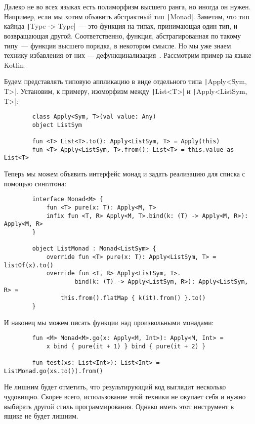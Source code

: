 \documentclass[12pt]{article}
\begin{document}

    Далеко не во всех языках есть полиморфизм высшего ранга, но иногда он нужен.
    Например, если мы хотим объявить абстрактный тип \texttt|Monad|.
    Заметим, что тип кайнда \texttt|Type -> Type|~--- это функция на типах, принимающая один тип, и возвращающая другой.
    Соответственно, функция, абстрагированная по такому типу~--- функция высшего порядка, в некотором смысле.
    Но мы уже знаем технику избавления от них --- дефункцинализация~\cite{defunctionalization-slides}.
    Рассмотрим пример на языке Kotlin.

    Будем представлять типовую аппликацию в виде отдельного типа \texttt|Apply<Sym, T>|.
    Установим, к примеру, изоморфизм между \texttt|List<T>| и \texttt|Apply<ListSym, T>|:
    \begin{verbatim}
        class Apply<Sym, T>(val value: Any)
        object ListSym

        fun <T> List<T>.to(): Apply<ListSym, T> = Apply(this)
        fun <T> Apply<ListSym, T>.from(): List<T> = this.value as List<T>
    \end{verbatim}

    Теперь мы можем объявить интерфейс монад и задать реализацию для списка с помощью синглтона:
    \begin{verbatim}
        interface Monad<M> {
            fun <T> pure(x: T): Apply<M, T>
            infix fun <T, R> Apply<M, T>.bind(k: (T) -> Apply<M, R>): Apply<M, R>
        }

        object ListMonad : Monad<ListSym> {
            override fun <T> pure(x: T): Apply<ListSym, T> = listOf(x).to()
            override fun <T, R> Apply<ListSym, T>.
                    bind(k: (T) -> Apply<ListSym, R>): Apply<ListSym, R> =
                this.from().flatMap { k(it).from() }.to()
        }
    \end{verbatim}

    И наконец мы можем писать функции над произвольными монадами:
    \begin{verbatim}
        fun <M> Monad<M>.go(x: Apply<M, Int>): Apply<M, Int> =
            x bind { pure(it + 1) } bind { pure(it + 2) }

        fun test(xs: List<Int>): List<Int> = ListMonad.go(xs.to()).from()
    \end{verbatim}

    Не лишним будет отметить, что результирующий код выглядит несколько чудовищно.
    Скорее всего, использование этой техники не окупает себя и нужно выбирать другой стиль программирования.
    Однако иметь этот инструмент в ящике не будет лишним.
\end{document}
